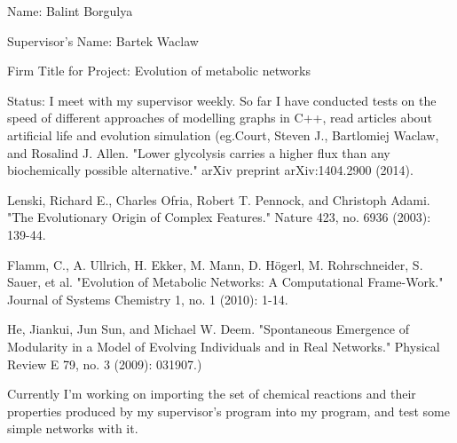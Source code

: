 \documentclass[]{article}
\begin{document}
Name: Balint Borgulya

Supervisor's Name: Bartek Waclaw

Firm Title for Project: Evolution of metabolic networks



Status: I meet with my supervisor weekly. So far I have conducted tests on the speed of different approaches of modelling graphs in C++, read articles about artificial life and evolution simulation (eg.Court, Steven J., Bartlomiej Waclaw, and Rosalind J. Allen. "Lower glycolysis carries a higher flux than any biochemically possible alternative." arXiv preprint arXiv:1404.2900 (2014).

Lenski, Richard E., Charles Ofria, Robert T. Pennock, and Christoph Adami. "The Evolutionary Origin of Complex Features." Nature 423, no. 6936 (2003): 139-44.

Flamm, C., A. Ullrich, H. Ekker, M. Mann, D. Högerl, M. Rohrschneider, S. Sauer, et al. "Evolution of Metabolic Networks: A Computational Frame-Work." Journal of Systems Chemistry 1, no. 1 (2010): 1-14.

He, Jiankui, Jun Sun, and Michael W. Deem. "Spontaneous Emergence of Modularity in a Model of Evolving Individuals and in Real Networks." Physical Review E 79, no. 3 (2009): 031907.) 

Currently I'm working on importing the set of chemical reactions and their properties produced by my supervisor's program into my program, and test some simple networks with it. 
\end{document}
